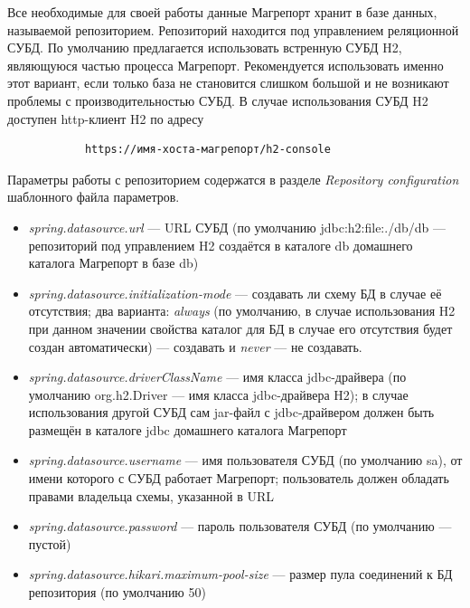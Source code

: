 \documentclass[../user-manual.tex]{subfiles}
\begin{document}
	Все необходимые для своей работы данные Магрепорт хранит в базе данных, называемой репозиторием. Репозиторий находится под управлением реляционной СУБД. По умолчанию предлагается использовать встренную СУБД H2, являющуюся частью процесса Магрепорт. Рекомендуется использовать именно этот вариант, если только база не становится слишком большой и не возникают проблемы с производительностью СУБД. В случае использования СУБД H2 доступен http-клиент H2 по адресу
	
	\begin{verbatim}
			https://имя-хоста-магрепорт/h2-console
	\end{verbatim}

	Параметры работы с репозиторием содержатся в разделе \textit{Repository configuration} шаблонного файла параметров.
	
	\begin{itemize}
		\item \textit{spring.datasource.url} --- URL СУБД (по умолчанию jdbc:h2:file:./db/db --- репозиторий под управлением H2 создаётся в каталоге db домашнего каталога Магрепорт в базе db)
		
		\item \textit{spring.datasource.initialization-mode} --- создавать ли схему БД в случае её отсутствия; два варианта: \textit{always} (по умолчанию, в случае использования H2 при данном значении свойства каталог для БД в случае его отсутствия будет создан автоматически) --- создавать и \textit{never} --- не создавать.
		
		\item \textit{spring.datasource.driverClassName} --- имя класса jdbc-драйвера (по умолчанию org.h2.Driver --- имя класса jdbc-драйвера H2); в случае использования другой СУБД сам jar-файл с jdbc-драйвером должен быть размещён в каталоге jdbc домашнего каталога Магрепорт
		
		\item \textit{spring.datasource.username} --- имя пользователя СУБД (по умолчанию sa), от имени которого с СУБД работает Магрепорт; пользователь должен обладать правами владельца схемы, указанной в URL
		
		\item \textit{spring.datasource.password} --- пароль пользователя СУБД (по умолчанию --- пустой)
		
		\item \textit{spring.datasource.hikari.maximum-pool-size} ---  размер пула соединений к БД репозитория (по умолчанию 50)
			
	\end{itemize}
\end{document}
